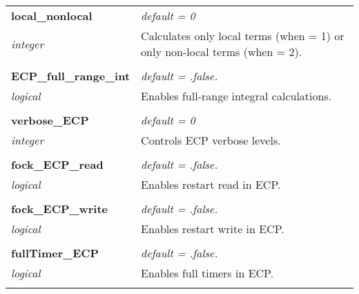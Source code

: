 \begin{Spacing}{1.0}
\begin{longtable}{ p{} p{} }
   \textbf{local\_nonlocal}
   &  \textit{default = 0}
   \\*\textit{integer}
   & Calculates only local terms (when = 1) or
   only non-local terms (when = 2).\\* \\

   \textbf{ECP\_full\_range\_int}
   &  \textit{default = .false. }
   \\*\textit{logical}
   & Enables full-range integral calculations.\\* \\

   \textbf{verbose\_ECP}
   &  \textit{default = 0}
   \\*\textit{integer}
   & Controls ECP verbose levels.\\* \\

   \textbf{fock\_ECP\_read}
   &  \textit{default = .false. }
   \\*\textit{logical}
   & Enables restart read in ECP.\\* \\

   \textbf{fock\_ECP\_write}
   &  \textit{default = .false. }
   \\*\textit{logical}
   & Enables restart write in ECP.\\* \\

   \textbf{fullTimer\_ECP}
   &  \textit{default = .false. }
   \\*\textit{logical}
   & Enables full timers in ECP.\\* \\

\end{longtable}
\label{tablaECP2}
\end{Spacing}
